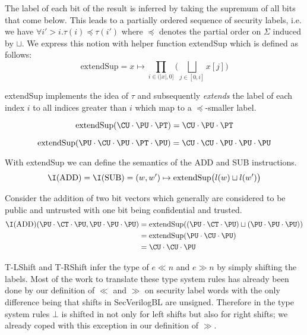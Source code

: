 The label of each bit of the result is inferred by taking the supremum of all bits that come below.
This leads to a partially ordered sequence of security labels, i.e. we have $ \forall i' > i. \tau(i) \preceq \tau(i') $ where $ \preceq $ denotes the partial order on $ \Sigma $ induced by $ \sqcup $.
We express this notion with helper function extendSup which is defined as follows:
\begin{equation*}
    \text{extendSup} = x \mapsto \prod_{i \in (|x|, 0]} \Big( \bigsqcup_{j \in [0, i]} x[j] \Big)
\end{equation*}

extendSup implements the idea of $ \tau $ and subsequently \textit{extends} the label of each index $ i $ to all indices greater than $ i $ which map to a $ \preceq $-smaller label.

\begin{example}
    \begin{equation*}
        \text{extendSup}(\CU \cdot
        \PU \cdot \PT) = \CU \cdot \PU \cdot \PT
    \end{equation*}

    \begin{equation*}
        \text{extendSup}(\PU \cdot \CU \cdot \PU \cdot \PT \cdot \PU) = \CU \cdot \CU \cdot \PU \cdot \PU \cdot \PU
    \end{equation*}
\end{example}

With extendSup we can define the semantics of the ADD and SUB instructions.
\begin{equation*}
    \I(\text{ADD}) = \I(\text{SUB}) = (w, w') \mapsto \text{extendSup}\big(l(w) \sqcup l(w') \big)
\end{equation*}

\begin{example}
    Consider the addition of two bit vectors which generally are considered to be public and untrusted with one bit being confidential and trusted.
    \begin{align*}
        \I(\text{ADD})(\PU \cdot \CT \cdot \PU, \PU \cdot \PU \cdot \PU) &= \text{extendSup}((\PU \cdot \CT \cdot \PU) \sqcup (\PU \cdot \PU \cdot \PU)) \\
        &= \text{extendSup}(\PU \cdot \CU \cdot \PU) \\
        &= \CU \cdot \CU \cdot \PU
    \end{align*}
\end{example}

T-LShift and T-RShift infer the type of $ e \ll n $ and $ e \gg n $ by simply shifting the labels.
Most of the work to translate these type system rules has already been done by our definition of $ \ll $ and $ \gg $ on security label words with the only difference being that shifts in SecVerilogBL are unsigned.
Therefore in the type system rules $ \bot $ is shifted in not only for left shifts but also for right shifts; we already coped with this exception in our definition of $ \gg $.

